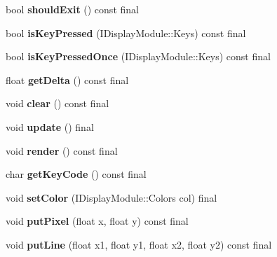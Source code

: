 \begin{DoxyCompactItemize}
bool {\bfseries should\+Exit} () const final
\item 
\mbox{\label{classArcade_1_1Display_1_1SDL_a375ea86360c510415d86a198f5cd3e30}} 
bool {\bfseries is\+Key\+Pressed} (I\+Display\+Module\+::\+Keys) const final
\item 
\mbox{\label{classArcade_1_1Display_1_1SDL_a883547b9f495cdf800225bc32b0ffe40}} 
bool {\bfseries is\+Key\+Pressed\+Once} (I\+Display\+Module\+::\+Keys) const final
\item 
\mbox{\label{classArcade_1_1Display_1_1SDL_a1ca09d130dea3bec2481eb72a49c0f03}} 
float {\bfseries get\+Delta} () const final
\item 
\mbox{\label{classArcade_1_1Display_1_1SDL_a537c85f0d2ebdd7d83484126baecf5da}} 
void {\bfseries clear} () const final
\item 
\mbox{\label{classArcade_1_1Display_1_1SDL_a9732415d73686f2b20693f280f3b596a}} 
void {\bfseries update} () final
\item 
\mbox{\label{classArcade_1_1Display_1_1SDL_a81d987b70ba70d67f92b9c93e2fea833}} 
void {\bfseries render} () const final
\item 
\mbox{\label{classArcade_1_1Display_1_1SDL_a3ba94b49b72c9e189f52af7b97f4ad91}} 
char {\bfseries get\+Key\+Code} () const final
\item 
\mbox{\label{classArcade_1_1Display_1_1SDL_a061a0536f59a8a27a370c9d39bf2f39f}} 
void {\bfseries set\+Color} (I\+Display\+Module\+::\+Colors col) final
\item 
\mbox{\label{classArcade_1_1Display_1_1SDL_a5c3f965b3394c9654f3537cab1201c1c}} 
void {\bfseries put\+Pixel} (float x, float y) const final
\item 
\mbox{\label{classArcade_1_1Display_1_1SDL_a4bfe74035db304e935265aae7d85f21a}} 
void {\bfseries put\+Line} (float x1, float y1, float x2, float y2) const final

\end{DoxyCompactItemize}
